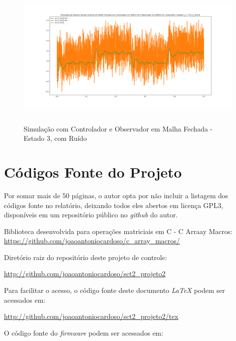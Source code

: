 \documentclass[
	12pt,				%
	article,			%
	openright,			%
	oneside,
	a4paper,			%
	chapter=TITLE,		%
	section=TITLE,		%
	english,			%
	french,				%
	spanish,			%
	brazil,				%
]{abntex2}
\begin{document}
\begin{apendicesenv}
        	\begin{figure}[htbp]
            	\centering
            	\caption{Simulação com Controlador e Observador em Malha Fechada - Estado 3, com Ruído}
            	\includegraphics[width=\textwidth,height=240px,keepaspectratio]{imgs/step_response_closedloop_observer_state3_noise.png}
            	\label{fig-step_response_closedloop_observer_state3_noise}
        	\end{figure}
        	
        	\FloatBarrier
        	
    	\clearpage
        \chapter{Códigos Fonte do Projeto}
            \label{ap-scripts}
            Por somar mais de 50 páginas, o autor opta por não incluir a listagem dos códigos fonte no relatório, deixando todos  eles abertos em licença GPL3, disponíveis em um repositório público no \textit{github} do autor.
            
            Biblioteca desenvolvida para operações matriciais em C - C Arraay Macros:
            \url{https://github.com/joaoantoniocardoso/c_array_macros/}
            
            Diretório raiz do repositório deste projeto de controle:
            
            \url{http://github.com/joaoantoniocardoso/sct2_projeto2}
            
            Para facilitar o acesso, o código fonte deste documento \textit{LaTeX} podem ser acessados em:
            
            \url{http://github.com/joaoantoniocardoso/sct2_projeto2/tex}
            
            O código fonte do \textit{firmware} podem ser acessados em:
            

\end{apendicesenv}
\end{document}
